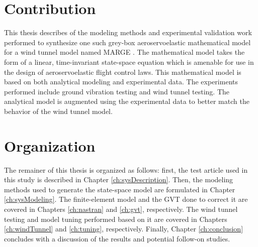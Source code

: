 \section{Contribution}

This thesis describes of the modeling methods and experimental validation work performed to synthesize one such grey-box aeroservoelastic mathematical model for a wind tunnel model named MARGE \cite{Quenzer2019}. The mathematical model takes the form of a linear, time-invariant state-space equation which is amenable for use in the design of aeroservoelastic flight control laws. This mathematical model is based on both analytical modeling and experimental data. The experiments performed include ground vibration testing and wind tunnel testing. The analytical model is augmented using the experimental data to better match the behavior of the wind tunnel model.

%
%

\section{Organization} %

The remainer of this thesis is organized as follows: first, the test article used in this study is described in Chapter \ref{ch:sysDescription}. Then, the modeling methods used to generate the state-space model are formulated in Chapter \ref{ch:sysModeling}. The finite-element model and the GVT done to correct it are covered in Chapters \ref{ch:nastran} and \ref{ch:gvt}, respectively. The wind tunnel testing and model tuning performed based on it are covered in Chapters \ref{ch:windTunnel} and \ref{ch:tuning}, respectively. Finally, Chapter \ref{ch:conclusion} concludes with a discussion of the results and potential follow-on studies.